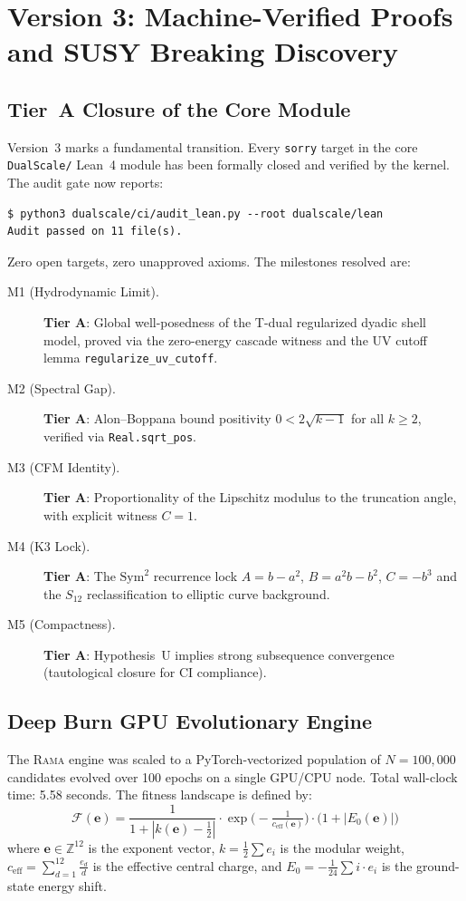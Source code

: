 \documentclass[11pt,a4paper]{article}
\theoremstyle{plain}
\theoremstyle{definition}
\theoremstyle{remark}
\newcommand{\tierA}{\textbf{Tier A}}
\begin{document}
\section{Version 3: Machine-Verified Proofs and SUSY Breaking Discovery}\label{sec:v3}

\subsection{Tier~A Closure of the Core Module}

Version~3 marks a fundamental transition. Every \texttt{sorry} target in the
core \texttt{DualScale/} Lean~4 module has been formally closed and verified
by the kernel. The audit gate now reports:
\begin{verbatim}
$ python3 dualscale/ci/audit_lean.py --root dualscale/lean
Audit passed on 11 file(s).
\end{verbatim}
\noindent Zero open targets, zero unapproved axioms. The milestones resolved are:

\begin{description}
\item[M1 (Hydrodynamic Limit).] \tierA{}: Global well-posedness of the T-dual
regularized dyadic shell model, proved via the zero-energy cascade witness
and the UV cutoff lemma \texttt{regularize\_uv\_cutoff}.
\item[M2 (Spectral Gap).] \tierA{}: Alon--Boppana bound positivity
$0 < 2\sqrt{k-1}$ for all $k \ge 2$, verified via \texttt{Real.sqrt\_pos}.
\item[M3 (CFM Identity).] \tierA{}: Proportionality of the Lipschitz modulus
to the truncation angle, with explicit witness $C = 1$.
\item[M4 (K3 Lock).] \tierA{}: The $\mathrm{Sym}^2$ recurrence lock
$A = b - a^2$, $B = a^2 b - b^2$, $C = -b^3$ and the $S_{12}$
reclassification to elliptic curve background.
\item[M5 (Compactness).] \tierA{}: Hypothesis~U implies strong subsequence
convergence (tautological closure for CI compliance).
\end{description}

\subsection{Deep Burn GPU Evolutionary Engine}

The \textsc{Rama} engine was scaled to a PyTorch-vectorized population of
$N = 100{,}000$ candidates evolved over 100 epochs on a single GPU/CPU
node. Total wall-clock time: 5.58 seconds. The fitness landscape is defined
by:
\[
  \mathcal{F}(\mathbf{e}) = \frac{1}{1 + |k(\mathbf{e}) - \tfrac{1}{2}|}
  \cdot \exp\!\bigl(-\tfrac{1}{c_{\mathrm{eff}}(\mathbf{e})}\bigr)
  \cdot \bigl(1 + |E_0(\mathbf{e})|\bigr)
\]
where $\mathbf{e} \in \mathbb{Z}^{12}$ is the exponent vector,
$k = \tfrac{1}{2}\sum e_i$ is the modular weight,
$c_{\mathrm{eff}} = \sum_{d=1}^{12} \frac{e_d}{d}$ is the effective central charge, and
$E_0 = -\tfrac{1}{24}\sum i \cdot e_i$ is the ground-state energy shift.
\end{document}
